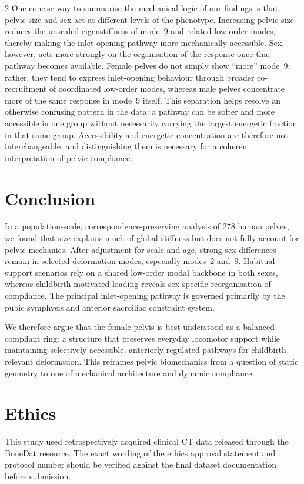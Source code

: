 \documentclass[openacc]{rsproca_new}
\begin{document}
\begin{multicols}{2}
One concise way to summarise the mechanical logic of our findings is that pelvic size and sex act at different levels of the phenotype. Increasing pelvic size reduces the unscaled eigenstiffness of mode~9 and related low-order modes, thereby making the inlet-opening pathway more mechanically accessible. Sex, however, acts more strongly on the organisation of the response once that pathway becomes available. Female pelves do not simply show ``more'' mode~9; rather, they tend to express inlet-opening behaviour through broader co-recruitment of coordinated low-order modes, whereas male pelves concentrate more of the same response in mode~9 itself. This separation helps resolve an otherwise confusing pattern in the data: a pathway can be softer and more accessible in one group without necessarily carrying the largest energetic fraction in that same group. Accessibility and energetic concentration are therefore not interchangeable, and distinguishing them is necessary for a coherent interpretation of pelvic compliance.

\section{Conclusion}

In a population-scale, correspondence-preserving analysis of 278 human pelves, we found that size explains much of global stiffness but does not fully account for pelvic mechanics. After adjustment for scale and age, strong sex differences remain in selected deformation modes, especially modes~2 and~9. Habitual support scenarios rely on a shared low-order modal backbone in both sexes, whereas childbirth-motivated loading reveals sex-specific reorganisation of compliance. The principal inlet-opening pathway is governed primarily by the pubic symphysis and anterior sacroiliac constraint system.

We therefore argue that the female pelvis is best understood as a balanced compliant ring: a structure that preserves everyday locomotor support while maintaining selectively accessible, anteriorly regulated pathways for childbirth-relevant deformation. This reframes pelvic biomechanics from a question of static geometry to one of mechanical architecture and dynamic compliance.

\section*{Ethics}

This study used retrospectively acquired clinical CT data released through the BoneDat resource. The exact wording of the ethics approval statement and protocol number should be verified against the final dataset documentation before submission.


\end{multicols}
\end{document}

